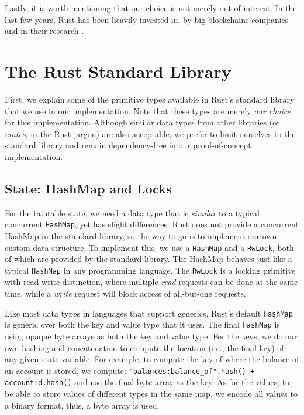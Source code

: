 Lastly, it is worth mentioning that our choice is not merely out of interest. In the last few years,
Rust has been heavily invested in, by big blockchains companies and in their research
\cite{RustBlockchain}.

\section{The Rust Standard Library}

First, we explain some of the primitive types available in Rust's standard library that we use
in our implementation. Note that these types are merely \textit{our choice} for this implementation.
Although similar data types from other libraries (or \textit{crates}, in the Rust jargon) are also
acceptable, we prefer to limit ourselves to the standard library and remain dependency-free in our
proof-of-concept implementation.

\subsection{State: HashMap and Locks} \label{chap:impl:subsec:state_and_concurrent_map}

For the taintable state, we need a data type that is \textit{similar} to a typical concurrent
\texttt{HashMap}\cite{barnatFastDynamicallySizedConcurrent2015}, yet has slight differences. Rust
does not provide a concurrent HashMap in the standard library, so the way to go is to
implement our own custom data structure. To implement this, we use a \texttt{HashMap} and a
\texttt{RwLock}, both of which are provided by the standard library. The HashMap behaves just like a
typical \texttt{HashMap} in any programming language. The \texttt{RwLock} is a locking primitive
with read-write distinction, where multiple \textit{read} requests can be done at the same time,
while a \textit{write} request will block access of all-but-one requests.

Like most data types in languages that support generics, Rust's default \texttt{HashMap} is
generic over both the key and value type that it uses. The final \texttt{HashMap} is using opaque
byte arrays as both the key and value type. For the keys, we do our own hashing and concatenation to
compute the location (i.e., the final key) of any given state variable. For example, to compute the
key of where the balance of an account is stored, we compute: \texttt{"balances:balance\_of".hash()
+ accountId.hash()} and use the final byte array as the key. As for the values, to be able to store
values of different types in the same map, we encode all values to a binary format, thus, a byte
array is used.


